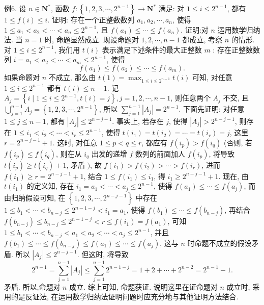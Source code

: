 例6. 设 $n \in \mathbf{N}^*$, 函数 $f:\left\{1,2,3, \cdots, 2^{n-1}\right\} \rightarrow \mathbf{N}^*$ 满足: 对 $1 \leqslant i \leqslant 2^{n-1}$, 都有 $1 \leqslant f(i) \leqslant i$. 证明: 存在一个正整数数列 $a_1, a_2, \cdots, a_n$, 使得 $1 \leqslant a_1<a_2<\cdots<a_n \leqslant 2^{n-1}$, 且 $f\left(a_1\right) \leqslant \cdots \leqslant f\left(a_n\right)$.
证明:对 $n$ 运用数学归纳法.
当 $n=1$ 时, 命题显然成立.
现设命题对 $1,2, \cdots, n-1$ 都成立, 考察 $n$ 的情形.
对 $1 \leqslant i \leqslant 2^{n-1}$, 我们用 $t(i)$ 表示满足下述条件的最大正整数 $m$ :
存在正整数数列 $i=a_1<a_2<\cdots<a_m \leqslant 2^{n-1}$, 使得
$$
f\left(a_1\right) \leqslant f\left(a_2\right) \leqslant \cdots \leqslant f\left(a_m\right) .
$$
如果命题对 $n$ 不成立, 那么由 $t(1)=\max _{1 \leqslant i \leqslant 2^{n-1}} t(i)$ 可知, 对任意 $1 \leqslant i \leqslant 2^{n-1}$ 都有 $t(i) \leqslant n-1$. 记 $A_j=\left\{i \mid 1 \leqslant i \leqslant 2^{n-1}, t(i)=j\right\}, j=1,2, \cdots, n-1$, 则任意两个 $A_j$ 不交, 且 $\bigcup_{j=1}^{n-1} A_j=\left\{1,2,3, \cdots, 2^{n-1}\right\}$, 所以 $\sum_{j=1}^{n-1}\left|A_j\right|=2^{n-1}$.
下面先证明: 对任意 $1 \leqslant j \leqslant n-1$, 都有 $\left|A_j\right| \leqslant 2^{n-j-1}$.
事实上, 若存在 $j$, 使得 $\left|A_j\right|>2^{n-j-1}$, 则存在 $1 \leqslant i_1<i_2<\cdots<i_r \leqslant 2^{n-1}$, 使得 $t\left(i_1\right)=t\left(i_2\right)=\cdots=t\left(i_r\right)=j$, 这里 $r=2^{n-j-1}+1$. 这时, 对任意 $1 \leqslant p<q \leqslant r$, 都应有 $f\left(i_p\right)>f\left(i_q\right)$ (否则, 若 $f\left(i_p\right) \leqslant f\left(i_q\right)$, 则在从 $i_q$ 出发的递增 $f$ 数列的前面加人 $f\left(i_p\right)$, 将导致 $t\left(i_p\right) \geqslant t\left(i_q\right)+1$, 矛盾 $)$, 故 $f\left(i_1\right)> f\left(i_2\right)>\cdots>f\left(i_r\right)$, 进而 $f\left(i_1\right) \geqslant r=2^{n-j-1}+1$, 结合 $1 \leqslant f\left(i_1\right) \leqslant i_1$, 得 $i_1 \geqslant 2^{n-j-1}+1$.
现在, 由 $t\left(i_1\right)$ 的定义知, 存在 $i_1=a_1<\cdots<a_j \leqslant 2^{n-1}$, 使得 $f\left(a_1\right) \leqslant \cdots \leqslant f\left(a_j\right)$, 而由归纳假设可知, 在 $\left\{1,2,3, \cdots, 2^{n-j-1}\right\}$ 中存在 $1 \leqslant b_1<\cdots< b_{n-j} \leqslant 2^{n-1-j}<i_1=a_1$, 使得 $f\left(b_1\right) \leqslant \cdots \leqslant f\left(b_{n-j}\right)$, 再结合 $f\left(b_{n-j}\right) \leqslant b_{n-j} \leqslant 2^{n-1-j}<r \leqslant f\left(i_1\right)=f\left(a_1\right)$, 可知 $1 \leqslant b_1<\cdots<b_{n-j}<a_1<a_2<\cdots<a_j \leqslant 2^{n-1}$, 并且 $f\left(b_1\right) \leqslant \cdots \leqslant f\left(b_{n-j}\right) \leqslant f\left(a_1\right) \leqslant \cdots \leqslant f\left(a_j\right)$, 这与 $n$ 时命题不成立的假设矛盾.
所以 $\left|A_j\right| \leqslant 2^{n-j-1}$.
但这时, 将导致
$$
2^{n-1}=\sum_{j=1}^{n-1}\left|A_j\right| \leqslant \sum_{j=1}^{n-1} 2^{n-1-j}=1+2+\cdots+2^{n-2}=2^{n-1}-1 .
$$
矛盾.
所以,命题对 $n$ 成立.
综上可知, 命题获证.
说明这里在证命题对 $n$ 成立时, 采用的是反证法, 在运用数学归纳法证明问题时应充分地与其他证明方法结合.


